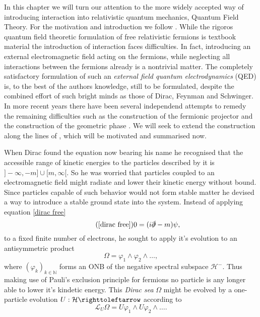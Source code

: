 \documentclass[b5paper,draft,openbib,12pt]{memoir}
\begin{document}
In this chapter we will turn our attention to the 
more widely accepted way of 
introducing interaction into relativistic quantum 
mechanics, Quantum Field Theory. For the motivation and 
introduction we follow \cite{deckert2016perspective}.
While the rigoros quantum field theoretic formulation of free 
relativistic fermions is textbook material
\cite{derezinski2013mathematics} the introduction of interaction faces 
difficulties. In fact, introducing an external electromagnetic field
acting on the fermions, 
while neglecting all interactions between the 
fermions already is a nontrivial 
matter. The completely satisfactory formulation of such an 
\emph{external field quantum electrodynamics} (QED) is, 
to the best of the authors 
knowledge, still to be formulated, despite the combined 
effort of such bright 
minds as those of Dirac\cite{dirac1934theorie}, 
 Feynman\cite{feynman1949theory} 
and Schwinger\cite{schwinger1951gauge}. 
In more recent years there have been several independend attempts 
to remedy the remaining difficulties such as the construction 
of the fermionic projector \cite{finster2016fermionic} 
and the construction of the geometric phase \cite{mickelsson2014phase}.
We will seek to extend the construction along the lines of 
\cite{ivp0,ivp1,ivp2}, which will be motivated and summarised
now. 

When Dirac found the equation now bearing his name he 
recognised that the accessible range of kinetic energies 
to the particles described by it is 
\(]-\infty, -m]\cup[m, \infty[\). So he was worried that 
particles coupled to an electromagnetic field might radiate 
and lower their kinetic energy without bound. Since particles 
capable of such behavior would not form stable matter he 
devised a way to introduce a stable ground state into the 
system. Instead of applying equation \eqref{dirac free}
\begin{equation}\tag{\ref{dirac free}}
  0= (i\slashed{\partial}-m) \psi,
\end{equation}
to a fixed finite number of electrons, he sought to apply 
it's evolution to an antisymmetric product 
\begin{equation}\label{infinite wedge}
  \Omega= \varphi_1\wedge \varphi_2\wedge \dots,
\end{equation}
where \((\varphi_k)_{k\in\mathbb{N}}\) forms an ONB of the negative spectral 
subspace \(\mathcal{H}^-\). Thus making use of 
Pauli's exclusion principle for 
fermions no particle is any longer able to lower it's kindetic 
energy.  This \emph{Dirac sea} \(\Omega\) might be evolved 
by a one-particle evolution \(U:\mathcal{H}\righttoleftarrow\)
according to 
\begin{equation}
  \mathcal{L}_U \Omega= U\varphi_1\wedge U \varphi_2\wedge \dots.
\end{equation}
\end{document}
